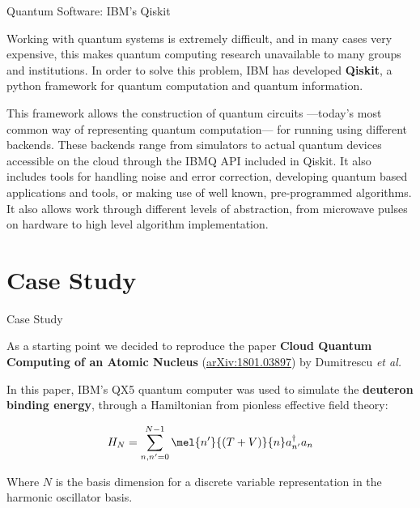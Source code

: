 \documentclass[9pt, handout, aspectratio=169]{beamer}		%
\begin{document}
	\begin{frame}{Quantum Software: IBM's Qiskit}

		Working with quantum systems is extremely difficult, and in many cases very expensive, this makes quantum computing research unavailable to many groups and institutions. In order to solve this problem, IBM has developed \textbf{Qiskit}, a python framework for quantum computation and quantum information.

		\medskip

		This framework allows the construction of quantum circuits ---today's most common way of representing quantum computation--- for running using different backends. These backends range from simulators to actual quantum devices accessible on the cloud through the IBMQ API included in Qiskit. It also includes tools for handling noise and error correction, developing quantum based applications and tools, or making use of well known, pre-programmed algorithms. It also allows work through different levels of abstraction, from microwave pulses on hardware to high level algorithm implementation.

	\end{frame}


\section{Case Study}

	\begin{frame}{Case Study}

		As a starting point we decided to reproduce the paper \textbf{Cloud Quantum Computing of an Atomic Nucleus} (\href{https://arxiv.org/abs/1801.03897}{arXiv:1801.03897}) by Dumitrescu \textit{et al.}

		\medskip

		In this paper, IBM's QX5 quantum computer was used to simulate the \textbf{deuteron binding energy}, through a Hamiltonian from pionless effective field theory:

		\begin{align*}
			H_N = \sum^{N-1}_{n,n'=0} \mel{n'}{(T+V)}{n}a^{\dagger}_{n'}a_{n}
		\end{align*}

		Where $N$ is the basis dimension for a discrete variable representation in the harmonic oscillator basis.

	\end{frame}
\end{document}
